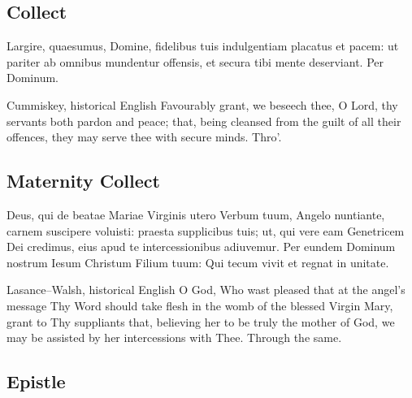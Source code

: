 
\subsection{Collect}\label{proper-collect}

\begin{latinproper}
Largire, quaesumus, Domine, fidelibus tuis indulgentiam placatus et pacem: ut pariter ab omnibus mundentur offensis, et secura tibi mente deserviant. Per Dominum.
\end{latinproper}

\begin{englishwitness}{Cummiskey, historical English}
Favourably grant, we beseech thee, O Lord, thy servants both pardon and peace; that, being cleansed from the guilt of all their offences, they may serve thee with secure minds. Thro'.
\end{englishwitness}

\subsection{Maternity Collect}\label{proper-maternity-collect}


\begin{latinproper}
Deus, qui de beatae Mariae Virginis utero Verbum tuum, Angelo nuntiante, carnem suscipere voluisti: praesta supplicibus tuis; ut, qui vere eam Genetricem Dei credimus, eius apud te intercessionibus adiuvemur. Per eundem Dominum nostrum Iesum Christum Filium tuum: Qui tecum vivit et regnat in unitate.
\end{latinproper}

\begin{englishwitness}{Lasance--Walsh, historical English}
O God, Who wast pleased that at the angel's message Thy Word should take flesh in the womb of the blessed Virgin Mary, grant to Thy suppliants that, believing her to be truly the mother of God, we may be assisted by her intercessions with Thee. Through the same.
\end{englishwitness}

\subsection{Epistle}\label{proper-epistle}

